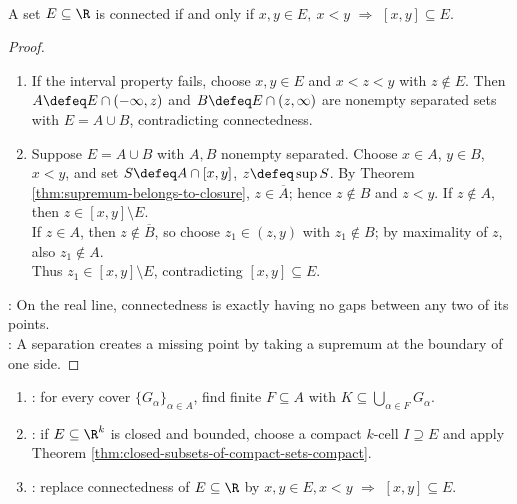 \begin{theorem} \label{thm:connected-subsets-of-real-line-interval-property} \\
A set $E\subseteq\R$ is connected if and only if $x,y\in E,\ x<y$ $\Longrightarrow$ $[x,y]\subseteq E$.
\begin{proof}
\begin{enumerate}[label=\roman*.]
\setlength{\itemsep}{0pt}
\item[$(\Rightarrow)$] If the interval property fails, choose $x,y\in E$ and $x<z<y$ with $z\notin E$. Then $A\defeq E\cap(-\infty,z)$ and $B\defeq E\cap(z,\infty)$ are nonempty separated sets with $E=A\cup B$, contradicting connectedness.
\item[$(\Leftarrow)$] Suppose $E=A\cup B$ with $A,B$ nonempty separated. Choose $x\in A$, $y\in B$, $x<y$, and set $S\defeq A\cap[x,y]$, $z\defeq\sup S$. By Theorem \ref{thm:supremum-belongs-to-closure}, $z\in\overline{A}$; hence $z\notin B$ and $z<y$. If $z\notin A$, then $z\in[x,y]\setminus E$.\\
If $z\in A$, then $z\notin\overline{B}$, so choose $z_1\in(z,y)$ with $z_1\notin B$; by maximality of $z$, also $z_1\notin A$.\\
Thus $z_1\in[x,y]\setminus E$, contradicting $[x,y]\subseteq E$.
\end{enumerate}
: On the real line, connectedness is exactly having no gaps between any two of its points.\\
: A separation creates a missing point by taking a supremum at the boundary of one side.
\end{proof}
\end{theorem}

\begin{method} \label{meth:compact-connected-proof-patterns} 
\begin{enumerate}[label=(\roman*)]
\setlength{\itemsep}{0pt}
\item {}: for every cover $\{G_\alpha\}_{\alpha\in A}$, find finite $F\subseteq A$ with $K\subseteq\bigcup\limits_{\alpha\in F}G_\alpha$.
\item {}: if $E\subseteq\R^k$ is closed and bounded, choose a compact $k$-cell $I\supseteq E$ and apply Theorem \ref{thm:closed-subsets-of-compact-sets-compact}.
\item {}: replace connectedness of $E\subseteq\R$ by $x,y\in E, x<y$ $\Longrightarrow$ $[x,y]\subseteq E$.
\end{enumerate}
\end{method}

